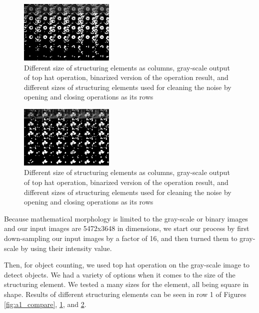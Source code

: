 \documentclass[conference]{IEEEtran}
\begin{document}
    \begin{figure}[h]
        \centering
        \includegraphics[width=0.4\textwidth]{resources/A2_compare.jpg}
        \caption{Different size of structuring elements as columns, gray-scale output of top hat operation, binarized version of the operation result, and different sizes of structuring elements used for cleaning the noise by opening and closing operations as its rows}
        \label{fig:a2_compare}
    \end{figure}

    \begin{figure}[h]
        \centering
        \includegraphics[width=0.4\textwidth]{resources/A3_compare.jpg}
        \caption{Different size of structuring elements as columns, gray-scale output of top hat operation, binarized version of the operation result, and different sizes of structuring elements used for cleaning the noise by opening and closing operations as its rows}
        \label{fig:a3_compare}
    \end{figure}

    Because mathematical morphology is limited to the gray-scale or binary images and our input images are 5472x3648 in dimensions, we start our process by first down-sampling our input images by a factor of 16, and then turned them to gray-scale by using their intensity value.

    Then, for object counting, we used top hat operation on the gray-scale image to detect objects. We had a variety of options when it comes to the size of the structuring element. We tested a many sizes for the element, all being square in shape. Results of different structuring elements can be seen in row 1 of Figures \ref{fig:a1_compare}, \ref{fig:a2_compare}, and \ref{fig:a3_compare}.
\end{document}
